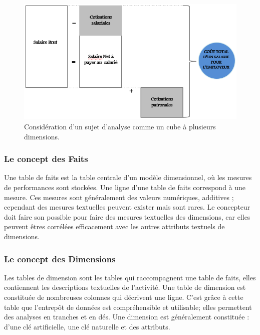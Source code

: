  \begin{figure}[h]
	\begin{center}
		\includegraphics[scale=0.85]{images/remuneration.png}
		\caption{Considération d’un sujet d’analyse comme un cube à plusieurs dimensions.}
		\label{Cube-dimensionnel}
	\end{center}
\end{figure}
 
 
 \subsubsection{Le concept des Faits}
 	 Une table de faits est la table centrale d’un modèle dimensionnel, où les mesures de performances sont stockées. Une ligne d’une table de faits correspond à une mesure. Ces mesures sont généralement des valeurs numériques, additives ; cependant des mesures textuelles peuvent exister mais sont rares. Le concepteur doit faire son possible pour faire des mesures textuelles des dimensions, car elles peuvent êtres corrélées efficacement avec les autres attributs textuels de dimensions.
 
 \subsubsection{Le concept des Dimensions}
 
  Les tables de dimension sont les tables qui raccompagnent une table de faits, elles contiennent les descriptions textuelles de l’activité. Une table de dimension est constituée de nombreuses colonnes qui décrivent une ligne. C’est grâce à cette table que l’entrepôt de données est compréhensible et utilisable; elles permettent des analyses en tranches et en dés. Une dimension est généralement constituée : d’une clé artificielle, une clé naturelle et des attributs.
  
